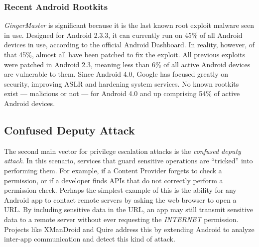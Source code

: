 \subsubsection{Recent Android Rootkits}
\label{sec:recentrootkits}
\textit{GingerMaster}\citep{cskills2011} is significant because it is the last known root exploit malware seen in use. Designed for Android 2.3.3, it can currently run on 45\% of all Android devices in use, according to the official Android Dashboard\citep{androiddashboard}. In reality, however, of that 45\%, almost all have been patched to fix the exploit\citep{cskills2011}. All previous exploits were patched in Android 2.3\citep{cskills2011}, meaning less than 6\% of all active Android devices are vulnerable to them. Since Android 4.0, Google has focused greatly on security, improving ASLR\citep{threatpost2012} and hardening system services\citep{androidjbsecurity}. No known rootkits exist --- malicious or not --- for Android 4.0 and up comprising 54\% of active Android devices.


\subsection{Confused Deputy Attack}
The second main vector for privilege escalation attacks is the \textit{confused deputy attack}\citep{hardy1988confused}. In this scenario, services that guard sensitive operations are ``tricked'' into performing them. For example, if a Content Provider forgets to check a permission, or if a developer finds APIs that do not correctly perform a permission check. Perhaps the simplest example of this is the ability for any Android app to contact remote servers by asking the web browser to open a URL. By including sensitive data in the URL, an app may still transmit sensitive data to a remote server without ever requesting the \textit{INTERNET} permission. Projects like XManDroid\citep{bugiel2011xmandroid} and Quire\citep{dietz2011quire} address this by extending Android to analyze inter-app communication and detect this kind of attack. %

